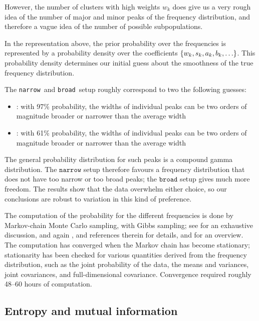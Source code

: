 \documentclass[\ifafour a4paper,12pt,\else a5paper,10pt,\fi%
onecolumn,oneside,article,%
british%
]{memoir}
\theoremstyle{remark}
\theoremstyle{innote}
\DeclarePairedDelimiter\set{\{}{\}} %
\renewcommand*{\|}[1][]{\nonscript\:#1\vert\nonscript\:\mathopen{}}
\newcommand*{\chap}{ch.}%
\newcommand*{\narrow}{\texttt{narrow}}
\newcommand*{\broad}{\texttt{broad}}
\begin{document}
However, the number of clusters with high weights $w_{k}$ does give us a
very rough idea of the number of major and minor peaks of the frequency
distribution, and therefore a vague idea of the number of possible
subpopulations.

In the representation above, the prior probability over the frequencies is
represented by a probability density over the coefficients
$\set{w_{k},s_{k},a_{k},b_{k},\dotsc}$. This probability density determines
our initial guess about the smoothness of the true frequency
distribution.

The \narrow\ and \broad\ setup roughly correspond to two the following
guesses:
\begin{itemize}[wide]
\item[\narrow]\!: with 97\% probability, the widths of individual peaks can
  be two orders of magnitude broader or narrower than the average width
\item[\broad]\!: with 61\% probability, the widths of individual peaks can
  be two orders of magnitude broader or narrower than the average width
\end{itemize}
The general probability distribution for such peaks is a compound gamma
distribution. The $\narrow$ setup therefore favours a frequency
distribution that does not have too narrow or too broad peaks; the $\broad$
setup gives much more freedom. The results show that the data overwhelm
either choice, so our conclusions are robust to variation in this kind of
preference.

\bigskip

The computation of the probability for the different frequencies is done by
Markov-chain Monte Carlo sampling, with Gibbs sampling; see
\textcite{neal1993} for an exhaustive discussion, and again
\textcite{dunsonetal2011}, \textcite{rasmussen1999} and references therein
for details, and \textcite[\chap~29]{mackay1995_r2005} for an overview. The
computation has converged when the Markov chain has become stationary;
stationarity has been checked for various quantities derived from the
frequency distribution, such as the joint probability of the data, the
means and variances, joint covariances, and full-dimensional covariance.
Convergence required roughly 48--60 hours of computation.



\subsection{Entropy and mutual information}
\label{sec:mutualionfo}
\end{document}
